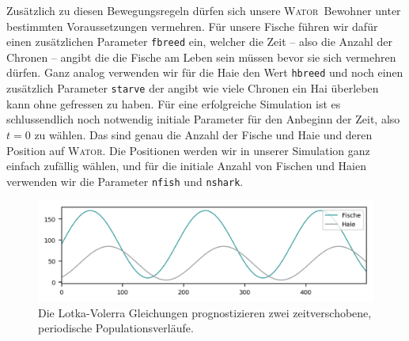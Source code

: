 \documentclass[a4paper,11pt]{article}
\newcommand{\wator}{\textsc{Wator}}
\theoremstyle{definition}
\numberwithin{equation}{section}
\begin{document}
	Zusätzlich zu diesen Bewegungsregeln dürfen sich unsere \wator\ Bewohner unter bestimmten Voraussetzungen vermehren. Für unsere Fische führen wir dafür einen zusätzlichen Parameter \texttt{fbreed} ein, welcher die Zeit -- also die Anzahl der Chronen -- angibt die die Fische am Leben sein müssen bevor sie sich vermehren dürfen. Ganz analog verwenden wir für die Haie den Wert \texttt{hbreed} und noch einen zusätzlich Parameter \texttt{starve} der angibt wie viele Chronen ein Hai überleben kann ohne gefressen zu haben. Für eine erfolgreiche Simulation ist es schlussendlich noch notwendig initiale Parameter für den Anbeginn der Zeit, also $t = 0$ zu wählen. Das sind genau die Anzahl der Fische und Haie und deren Position auf \wator. Die Positionen werden wir in unserer Simulation ganz einfach zufällig wählen, und für die initiale Anzahl von Fischen und Haien verwenden wir die Parameter \texttt{nfish} und \texttt{nshark}. \newline

	\begin{figure}
		\centering
		\includegraphics[width=\textwidth]{pictures/lotka_volterra.png}
		\caption{Die Lotka-Volerra Gleichungen prognostizieren zwei zeitverschobene, periodische Populationsverläufe.}
		\label{fig:lotka_volterra}
	\end{figure}
\end{document}
